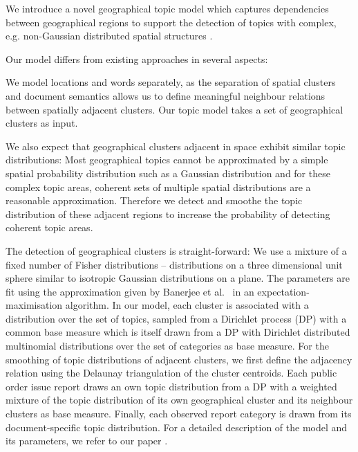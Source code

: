 \documentclass[external]{20120615_deliverable_template_ukob}
\theoremstyle{definition}
\begin{document}
We introduce a novel geographical topic model which captures dependencies between geographical
regions to support the detection of topics with complex, e.g. non-Gaus\-sian distributed spatial
structures \cite{CCK1}.

Our model differs from existing approaches in several aspects:

We model locations and words separately, as the separation of spatial clusters and document
semantics allows us to define meaningful neighbour relations between spatially adjacent
clusters. Our topic model takes a set of geographical clusters as input.

We also expect that geographical clusters adjacent in space exhibit similar topic distributions:
Most geographical topics cannot be approximated by a simple spatial probability distribution such as
a Gaussian distribution and for these complex topic areas, coherent sets of multiple spatial
distributions are a reasonable approximation.  Therefore we detect and smoothe the topic
distribution of these adjacent regions to increase the probability of detecting coherent topic
areas.

The detection of geographical clusters is straight-forward: We use a mixture of a fixed number of
Fisher distributions -- distributions on a three dimensional unit sphere similar to isotropic
Gaussian distributions on a plane. The parameters are fit using the approximation given by Banerjee
et al.~\cite{DBLP:journals/jmlr/BanerjeeDGS05} in an expectation-maximisation algorithm.  In our
model, each cluster is associated with a distribution over the set of topics, sampled from a
Dirichlet process (DP) with a common base measure which is itself drawn from a DP with Dirichlet
distributed multinomial distributions over the set of categories as base measure.  For the smoothing
of topic distributions of adjacent clusters, we first define the adjacency relation using the
Delaunay triangulation \cite{journals/csur/Aurenhammer91} of the cluster centroids.  Each public
order issue report draws an own topic distribution from a DP with a weighted mixture of the topic
distribution of its own geographical cluster and its neighbour clusters as base measure.  Finally,
each observed report category is drawn from its document-specific topic distribution.  For a
detailed description of the model and its parameters, we refer to our paper \cite{CCK1}.
\end{document}
